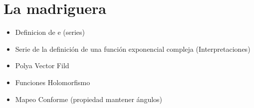 \chapter{La madriguera}
\begin{itemize}
    \item Definicion de e (series)
    \item Serie de la definición de una función exponencial compleja (Interpretaciones)
    \item Polya Vector Fild
    \item Funciones Holomorfismo
    \item Mapeo Conforme (propiedad mantener ángulos)
\end{itemize}